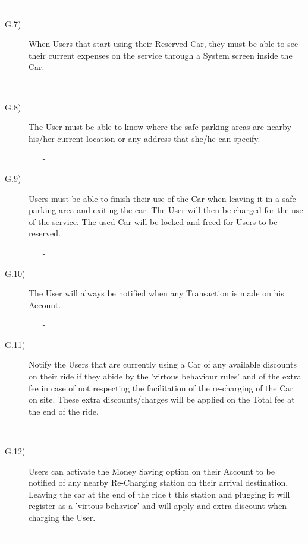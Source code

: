 \documentclass[a4paper]{article}
\begin{document}
\begin{description}
\begin{itemize}
	\item[-]
\end{itemize}
\item [G.7)]When Users that start using their Reserved Car, they must be able to see their current expenses on the service through a System screen inside the Car.
\begin{itemize}
	\item[-]
\end{itemize}
\item [G.8)]The User must be able to know where the safe parking areas are nearby his/her current location or any address that she/he can specify.
\begin{itemize}
	\item[-]
\end{itemize}
\item [G.9)]Users must be able to finish their use of the Car when leaving it in a safe parking area and exiting the car. The User will then be charged for the use of the service. The used Car will be locked and freed for Users to be reserved.
\begin{itemize}
	\item[-]
\end{itemize}
\item [G.10)]The User will always be notified when any Transaction is made on his Account.
\begin{itemize}
	\item[-]
\end{itemize}
\item [G.11)]Notify the Users that are currently using a Car of any available discounts on their ride if they abide by the 'virtous behaviour rules' and of the extra fee in case of not respecting the facilitation of the re-charging of the Car on site. These extra discounts/charges will be applied on the Total fee at the end of the ride.
\begin{itemize}
	\item[-]
\end{itemize}
\item [G.12)]Users can activate the Money Saving option on their Account to be notified of any nearby Re-Charging station on their arrival destination. Leaving the car at the end of the ride t this station and plugging it will register as a 'virtous behavior' and will apply and extra discount when charging the User.
\begin{itemize}
	\item[-]
\end{itemize}
\end{description}
\end{document}
